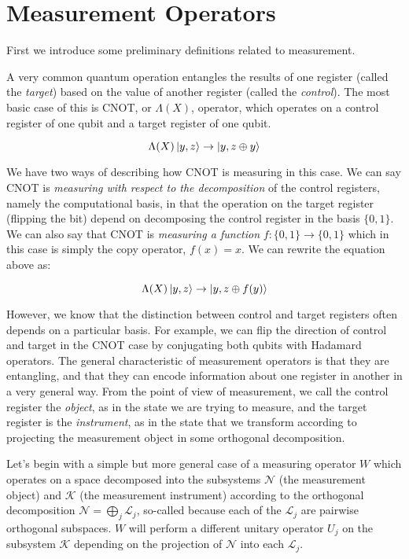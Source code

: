 \section{Measurement Operators}
\label{sec:meas-ops}

First we introduce some preliminary definitions related to measurement.

A very common quantum operation entangles the results of one register
(called the \emph{target}) based on the value of another register (called the
\emph{control}). The most basic case of this is CNOT, or $\Lambda(X)$,
operator, which operates
on a control register of one qubit and a target register of one qubit.

\begin{equation}
\Lambda(X)\left\vert{y,z}\right\rangle \rightarrow \left\vert{y, z \oplus y}\right\rangle
\end{equation}

We have two ways of describing how CNOT is measuring in this case.
We can say CNOT is \emph{measuring with respect to the decomposition} of
the control registers, namely the computational basis, in that the
operation on the target register (flipping the bit) depend on decomposing the
control register in the basis $\{0,1\}$. We can also say that CNOT is
\emph{measuring a function} $f:\{0,1\} \rightarrow \{0,1\}$ which in this
case is simply the copy operator, $f(x) = x$. We can rewrite the equation
above as:

\begin{equation}
\Lambda(X)\left\vert{y,z}\right\rangle \rightarrow \left\vert{y, z \oplus f(y)}\right\rangle
\end{equation}

However, we know that the distinction between control and target registers
often depends on a particular basis. For example, we can flip the direction
of control and target in the CNOT case by conjugating both qubits with
Hadamard operators. The general characteristic of measurement operators
is that they are entangling, and that they can encode information about
one register in another in a very general way.
From the point of view of measurement, we call the control register the
\emph{object}, as in the state we are trying to measure, and the target register
is the \emph{instrument}, as in the state that we transform according to
projecting the measurement object in some orthogonal decomposition.

Let's begin with a simple but more general case of a measuring operator
$W$ which operates on a space decomposed into the subsystems $\mathcal{N}$
(the measurement object) and $\mathcal{K}$ (the measurement instrument)
according to the orthogonal decomposition
$\mathcal{N} = \bigoplus_j \mathcal{L}_j$, so-called because
each of the $\mathcal{L}_j$ are pairwise orthogonal subspaces.
$W$ will perform a different unitary
operator $U_j$ on the subsystem $\mathcal{K}$
depending on the projection of $\mathcal{N}$ into each $\mathcal{L}_j$.

